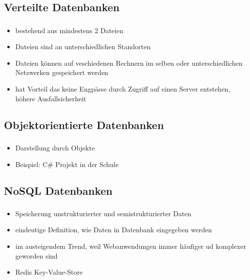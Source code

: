 \documentclass[aspectratio=169,14pt,xcolor=dvipsnames]{beamer}
\begin{document}
\subsection{Verteilte Datenbanken}
\begin{frame}[t]
    \frametitle{\secname}
    \framesubtitle{\subsecname}
    \begin{itemize}
        \item bestehend aus mindestens 2 Dateien
        \item Dateien sind an unterschiedlichen Standorten
        \item Dateien können auf veschiedenen Rechnern im selben oder unterschiedlichen Netzwerken gespeichert werden
        \item hat Vorteil das keine Engpässe durch Zugriff auf einen Server entstehen, höhere Ausfallsicherheit
    \end{itemize}
\end{frame}

\subsection{Objektorientierte Datenbanken}
\begin{frame}[t]
    \frametitle{\secname}
    \framesubtitle{\subsecname}
    \begin{itemize}
        \item Darstellung durch Objekte
        \item Beispiel: C\# Projekt in der Schule 
    \end{itemize}
\end{frame}

\subsection{NoSQL Datenbanken}
\begin{frame}[t]
    \frametitle{\secname}
    \framesubtitle{\subsecname}
    \begin{itemize}
        \item Speicherung unstrukturierter und semistrukturierter Daten
        \item eindeutige Definition, wie Daten in Datenbank eingegeben werden
        \item im austeigendem Trend, weil Webanwendungen immer häufiger ud komplexer geworden sind
        \item Redis Key-Value-Store
    \end{itemize}
\end{frame}
\end{document}
